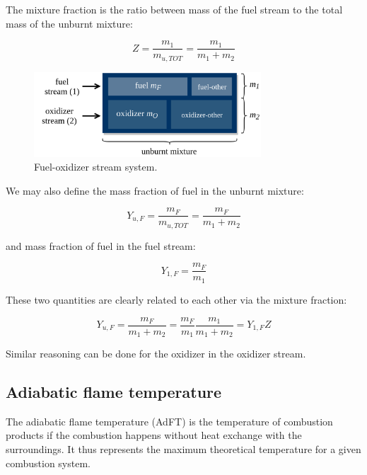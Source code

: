 \documentclass[10pt,twocolumn]{article}
\begin{document}
The mixture fraction is the ratio between mass of the fuel stream to the total mass of the unburnt mixture:

\begin{equation}
Z = \frac{m_1}{m_{u, TOT}} = \frac{m_1}{m_1 + m_2}
\end{equation}

\begin{figure}[H]
\centering\includegraphics[width=8.5cm]{mixture-fraction.png}
\caption{Fuel-oxidizer stream system.}			
\label{fig:mixture-fraction}
\end{figure}

We may also define the mass fraction of fuel in the unburnt mixture:

\begin{equation}
Y_{u, F} = \frac{m_F}{m_{u, TOT}} = \frac{m_F}{m_1 + m_2}
\end{equation}

and mass fraction of fuel in the fuel stream:

\begin{equation}
Y_{1, F} = \frac{m_F}{m_1}
\end{equation}

These two quantities are clearly related to each other via the mixture fraction:

\begin{equation}
Y_{u, F} = \frac{m_F}{m_1 + m_2} = \frac{m_F}{m_1} \frac{m_1}{m_1 + m_2} = Y_{1, F} Z
\end{equation}

Similar reasoning can be done for the oxidizer in the oxidizer stream.





\subsection{Adiabatic flame temperature}

The adiabatic flame temperature (AdFT) is the temperature of combustion products if the combustion happens without heat exchange with the surroundings. It thus represents the maximum theoretical temperature for a given combustion system.
\end{document}
